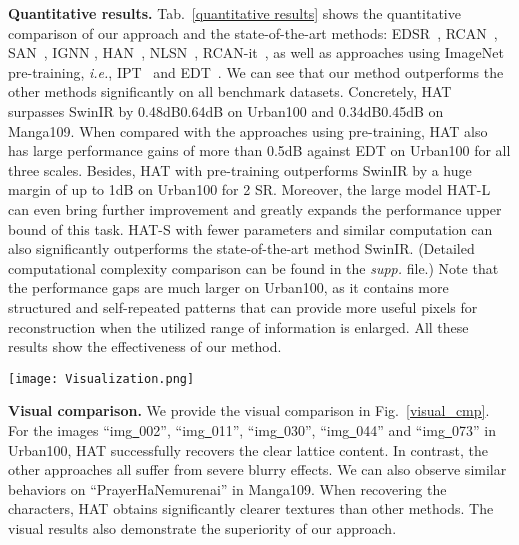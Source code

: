 \documentclass[10pt,twocolumn,letterpaper]{article}
\begin{document}
\noindent
\textbf{Quantitative results.}
Tab.~\ref{quantitative results} shows the quantitative comparison of our approach and the state-of-the-art methods: EDSR~\cite{edsr}, RCAN~\cite{rcan}, SAN~\cite{san}, IGNN \cite{ignn}, HAN~\cite{han}, NLSN~\cite{nlsn}, RCAN-it~\cite{rcanit}, as well as approaches using ImageNet pre-training, \textit{i.e.}, IPT~\cite{ipt} and EDT~\cite{edt}. We can see that our method outperforms the other methods significantly on all benchmark datasets. Concretely, HAT surpasses SwinIR by 0.48dB0.64dB on Urban100 and 0.34dB0.45dB on Manga109. When compared with the approaches using pre-training, HAT also has large performance gains of more than 0.5dB against EDT on Urban100 for all three scales. Besides, HAT with pre-training outperforms SwinIR by a huge margin of up to 1dB on Urban100 for 2 SR. Moreover, the large model HAT-L can even bring further improvement and greatly expands the performance upper bound of this task. HAT-S with fewer parameters and similar computation can also significantly outperforms the state-of-the-art method SwinIR. (Detailed computational complexity comparison can be found in the \textit{supp.} file.) Note that the performance gaps are much larger on Urban100, as it contains more structured and self-repeated patterns that can provide more useful pixels for reconstruction when the utilized range of information is enlarged. All these results show the effectiveness of our method. 

\begin{figure*}[!t]
\begin{center}
\texttt{[image: Visualization.png]}
\end{center}
\vspace{-0.5cm}
\caption{Visual comparison on 4 SR. The patches for comparison are marked with red boxes in the original images. PSNR/SSIM is calculated based on the patches to better reflect the performance difference.}
\label{visual_cmp}
\vspace{-0.5cm}
\end{figure*}

\noindent
\textbf{Visual comparison.}
We provide the visual comparison in Fig.~\ref{visual_cmp}. For the images ``img\underline{~}002'', ``img\underline{~}011'', ``img\underline{~}030'', ``img\underline{~}044'' and ``img\underline{~}073'' in Urban100, HAT successfully recovers the clear lattice content. In contrast, the other approaches all suffer from severe blurry effects. We can also observe similar behaviors on ``PrayerHaNemurenai'' in Manga109. When recovering the characters, HAT obtains significantly clearer textures than other methods. The visual results also demonstrate the superiority of our approach.
\end{document}
